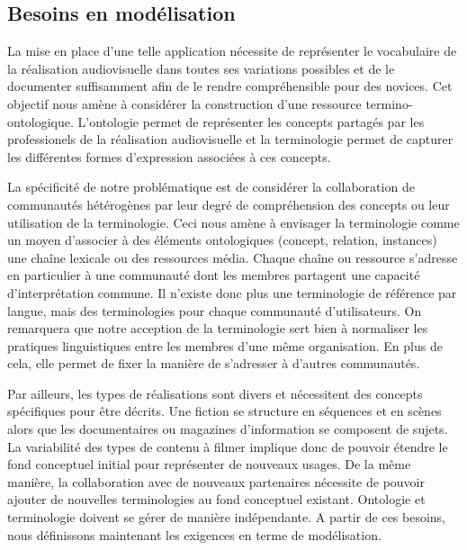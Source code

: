 \subsection{Besoins en modélisation}\label{sec:bm}
La mise en place d'une telle application nécessite de représenter le vocabulaire de la réalisation audiovisuelle dans toutes ses variations possibles et de le documenter suffisamment afin de le rendre compréhensible pour des novices. 
Cet objectif nous amène à considérer la construction d'une ressource termino-ontologique. L'ontologie permet de représenter les concepts partagés par les professionels de la réalisation audiovisuelle et la terminologie permet de capturer les différentes formes d'expression associées à ces concepts. 

La spécificité de notre problématique est de considérer la collaboration de communautés hétérogènes par leur degré de compréhension des concepts ou leur utilisation de la terminologie. 
Ceci nous amène à envisager la terminologie comme un moyen d'associer à des éléments ontologiques (concept, relation, instances) une chaîne lexicale ou des ressources média. 
Chaque chaîne ou ressource s'adresse en particulier à une communauté dont les membres partagent une capacité d'interprétation commune. 
Il n'existe donc plus une terminologie de référence par langue, mais des terminologies pour chaque communauté d'utilisateurs. 
On remarquera que notre acception de la terminologie sert bien à normaliser les pratiques linguistiques entre les membres d'une même organisation. 
En plus de cela, elle permet de fixer la manière de s'adresser à d'autres communautés.

Par ailleurs, les types de réalisations sont divers et nécessitent des concepts spécifiques pour être décrits. 
Une fiction se structure en séquences et en scènes alors que les documentaires ou magazines d'information se composent de sujets. 
La variabilité des types de contenu à filmer implique donc de pouvoir étendre le fond conceptuel initial pour représenter de nouveaux usages. 
De la même manière, la collaboration avec de nouveaux partenaires nécessite de pouvoir ajouter de nouvelles terminologies au fond conceptuel existant. 
Ontologie et terminologie doivent se gérer de manière indépendante. A partir de ces besoins, nous définissons maintenant les exigences en terme de modélisation. 

